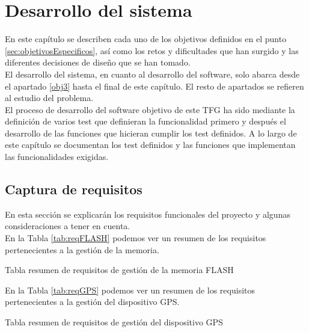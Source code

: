\chapter{Desarrollo del sistema}
\label{chap:desarrollo}

En este capítulo se describen cada uno de los objetivos definidos en el punto \ref{sec:objetivosEspecificos}, así como los retos y dificultades que han surgido y las diferentes decisiones de diseño que se han tomado.\\

El desarrollo del sistema, en cuanto al desarrollo del software, solo abarca desde el apartado \ref{obj3} hasta el final de este capítulo. El resto de apartados se refieren al estudio del problema.\\

El proceso de desarrollo del software objetivo de este \acs{TFG} ha sido mediante la definición de varios test que definieran la funcionalidad primero y después el desarrollo de las funciones que hicieran cumplir los test definidos. A lo largo de este capítulo se documentan los test definidos y las funciones que implementan las funcionalidades exigidas.\\


\section{Captura de requisitos}
\label{sec:requisitos}
En esta sección se explicarán los requisitos funcionales del proyecto y algunas consideraciones a tener en cuenta. \\

En la Tabla \ref{tab:reqFLASH} podemos ver un resumen de los requisitos pertenecientes a la gestión de la memoria.\\
 
\begin{table}[h!]
\centering

\caption {Tabla resumen de requisitos de gestión de la memoria FLASH}
\label{tab:reqFLASH}
\end{table}

En la Tabla \ref{tab:reqGPS} podemos ver un resumen de los requisitos pertenecientes a la gestión del dispositivo GPS.\\

\begin{table}[h!]
\centering

\caption {Tabla resumen de requisitos de gestión del dispositivo GPS}
\label{tab:reqGPS}
\end{table}

